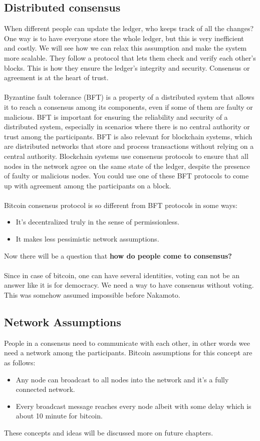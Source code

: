 \documentclass{report}
\begin{document}
\subsection{Distributed consensus}
 When different people can update the ledger, who keeps track of all the changes? One way is to have everyone store the whole ledger, but this is very inefficient and costly. We will see how we can relax this assumption and make the system more scalable. They follow a protocol that lets them check and verify each other’s blocks. This is how they ensure the ledger’s integrity and security. Consensus or agreement is at the heart of trust.\\\\
Byzantine fault tolerance (BFT) is a property of a distributed system that allows it to reach a consensus among its components, even if some of them are faulty or malicious. BFT is important for ensuring the reliability and security of a distributed system, especially in scenarios where there is no central authority or trust among the participants. BFT is also relevant for blockchain systems, which are distributed networks that store and process transactions without relying on a central authority. Blockchain systems use consensus protocols to ensure that all nodes in the network agree on the same state of the ledger, despite the presence of faulty or malicious nodes.  You could use one of these BFT protocols to come up with agreement among the participants on a block.\\\\
Bitcoin consensus protocol is so different from BFT protocols in some ways:
\begin{itemize}
	\item It's decentralized truly in the sense of permissionless.
	\item It makes less pessimistic network assumptions.
\end{itemize}
Now there will be a question that  \textbf{how do people come to consensus?}\\\\
Since in case of bitcoin, one can have several identities,  voting can not be an answer like it is for democracy. We  need a way to have consensus without voting. This was somehow assumed impossible before Nakamoto.
\subsection{Network Assumptions}
People in a consensus need to communicate with each other, in other words wee need a network among the participants.
Bitcoin assumptions for this concept are as follows:
\begin{itemize}
	\item Any node can broadcast to all nodes into the network and it's a fully connected network.
	\item Every broadcast message reaches every node albeit with some delay which is about 10 minute for bitcoin. 
\end{itemize}
These concepts and ideas will be discussed more on future chapters.
\end{document}
